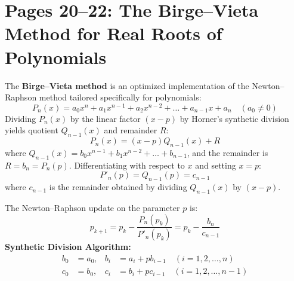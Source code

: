 \section{Pages 20--22: The Birge--Vieta Method for Real Roots of Polynomials}
\label{sec:page20_22_birge_vieta}

\begin{theorembox}
The \textbf{Birge--Vieta method} is an optimized implementation of the Newton--Raphson method tailored specifically for polynomials:
\begin{equation}
    P_n(x) = a_0 x^n + a_1 x^{n-1} + a_2 x^{n-2} + \dots + a_{n-1} x + a_n \quad (a_0 \ne 0)
\end{equation}
Dividing $P_n(x)$ by the linear factor $(x - p)$ by Horner's synthetic division yields quotient $Q_{n-1}(x)$ and remainder $R$:
\begin{equation}
    P_n(x) = (x - p) Q_{n-1}(x) + R
\end{equation}
where $Q_{n-1}(x) = b_0 x^{n-1} + b_1 x^{n-2} + \dots + b_{n-1}$, and the remainder is $R = b_n = P_n(p)$.
Differentiating with respect to $x$ and setting $x = p$:
\begin{equation}
    P'_n(p) = Q_{n-1}(p) = c_{n-1}
\end{equation}
where $c_{n-1}$ is the remainder obtained by dividing $Q_{n-1}(x)$ by $(x - p)$.

The Newton--Raphson update on the parameter $p$ is:
\begin{equation}
    \boxed{p_{k+1} = p_k - \frac{P_n(p_k)}{P'_n(p_k)} = p_k - \frac{b_n}{c_{n-1}}}
\end{equation}
\textbf{Synthetic Division Algorithm:}
\begin{align}
    b_0 &= a_0, & b_i &= a_i + p b_{i-1} \quad (i = 1, 2, \dots, n) \\
    c_0 &= b_0, & c_i &= b_i + p c_{i-1} \quad (i = 1, 2, \dots, n-1)
\end{align}
\end{theorembox}

